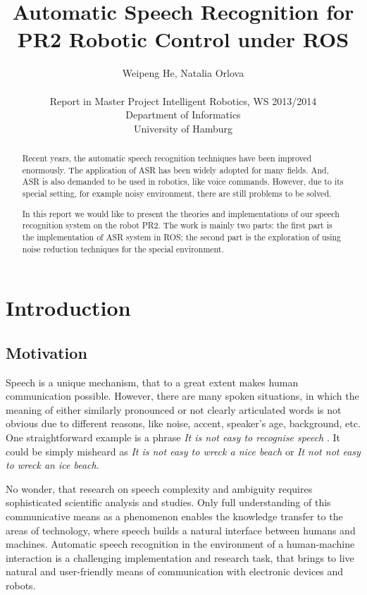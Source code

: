 \documentclass[11pt,a4paper]{report}
\begin{document}
 \title{Automatic Speech Recognition for PR2 Robotic Control under ROS} 
\author{Weipeng He, Natalia Orlova \\ \\
\small Report in Master Project Intelligent Robotics, WS 2013/2014\\
Department of Informatics\\ University of Hamburg}
\maketitle

\begin{abstract}
  Recent years, the automatic speech recognition techniques have been improved enormously. The application of ASR has been widely adopted for many fields. And, ASR is also demanded to be used in robotics, like voice commands. However, due to its special setting, for example noisy environment, there are still problems to be solved.

  In this report we would like to present the theories and implementations of our speech recognition system on the robot PR2. The work is mainly two parts: the first part is the implementation of ASR system in ROS; the second part is the exploration of using noise reduction techniques for the special environment.
\end{abstract}

\tableofcontents

\chapter{Introduction}
\label{sec:intro}

\section{Motivation}
Speech is a unique mechanism, that to a great extent makes human
communication possible. However, there are many spoken situations, in which
the meaning of  either similarly pronounced or  not clearly
articulated words is not obvious due to different reasons, like noise, accent,
speaker's age, background, etc. One straightforward example is  a phrase \textit
{It is not easy to recognise speech} . It could be simply misheard as \textit
{It is not easy to wreck a nice beach} or \textit {It not not easy to wreck an
ice beach}.

 No wonder, that research on speech complexity and
ambiguity requires sophisticated scientific analysis and studies. Only full 
understanding of this communicative means as a phenomenon enables the 
knowledge transfer to the areas of technology, where speech builds a natural
 interface between humans and machines.  Automatic speech recognition in the 
 environment of a human-machine interaction  is a challenging implementation and
 research task, that brings to live natural and user-friendly means of communication with electronic devices and robots. 
\end{document}
